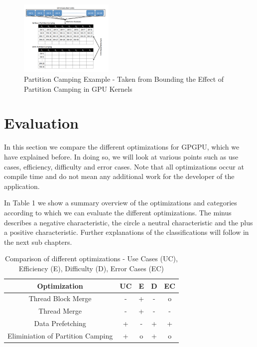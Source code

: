 \documentclass[conference]{IEEEtran}
\begin{document}
		\begin{figure}[htbp]
			\centerline{\includegraphics[width=0.4\textwidth]{PartitionCamping.png}}
			\caption{Partition Camping Example - Taken from Bounding the Effect of Partition Camping in GPU Kernels}
			\label{fig2}
		\end{figure}

\section{Evaluation}

	
	In this section we compare the different optimizations for GPGPU, which we have explained before. In doing so, we will look at various points such as use cases, efficiency, difficulty and error cases. Note that all optimizations occur at compile time and do not mean any additional work for the developer of the application.
	
	In Table 1 we show a summary overview of the optimizations and categories according to which we can evaluate the different optimizations. The minus describes a negative characteristic, the circle a neutral characteristic and the plus a positive characteristic. Further explanations of the classifications will follow in the next sub chapters.
	
	\begin{table}[htbp]
		\centering
		
			\begin{tabular}{ c | c | c | c | c }
				Optimization & UC & E & D & EC \\ \hline
				Thread Block Merge & - & + & - & o\\
				Thread Merge & - & + & - & -\\
				Data Prefetching & + & - & + & + \\
				Eliminiation of Partition Camping & + & o & + & o\\
			\end{tabular}
		
		\caption{Comparison of different optimizations - Use Cases (UC), Efficiency (E), Difficulty (D), Error Cases (EC)}
		\label{tab:table}
	\end{table}
	
\end{document}
